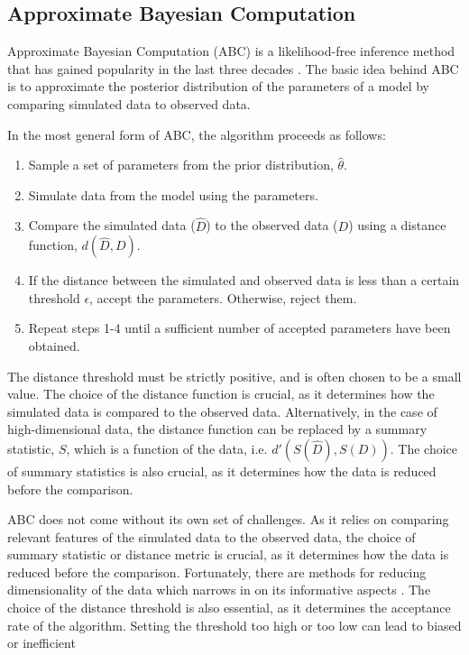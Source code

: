 \subsection{Approximate Bayesian Computation}
Approximate Bayesian Computation (ABC) is a likelihood-free inference method that has gained popularity in the
last three decades \cite{tavare_inferring_1997, lechevallier_integrating_2010, jagiella_parallelization_2017}.
The basic idea behind ABC is to approximate the posterior distribution of the parameters of a model by comparing
simulated data to observed data. \par
In the most general form of ABC, the algorithm proceeds as follows:
\begin{enumerate}
    \item Sample a set of parameters from the prior distribution, $\hat\theta$.
    \item Simulate data from the model using the parameters.
    \item Compare the simulated data ($\hat D$) to the observed data ($D$) using a distance function, $d(\hat D, D)$.
    \item If the distance between the simulated and observed data is less than a certain threshold $\epsilon$, accept the
    parameters. Otherwise, reject them.
    \item Repeat steps 1-4 until a sufficient number of accepted parameters have been obtained.
\end{enumerate}
The distance threshold must be strictly positive, and is often chosen to be a small value. The choice of the distance
function is crucial, as it determines how the simulated data is compared to the observed data. Alternatively, in the
case of high-dimensional data, the distance function can be replaced by a summary statistic, $S$, which is a function of the
data, i.e. $d'(S(\hat D), S(D))$. The choice of summary statistics is also crucial, as it determines how the data is
reduced before the comparison. \par
ABC does not come without its own set of challenges. As it relies on comparing relevant features of the simulated data to
the observed data, the choice of summary statistic or distance metric is crucial, as it determines how the data is
reduced before the comparison. Fortunately, there are methods for reducing dimensionality of the data which
narrows in on its informative aspects \cite{blum_comparative_2013}.
The choice of the distance threshold is also essential, as it determines
the acceptance rate of the algorithm. Setting the threshold too high or too low can lead to biased or inefficient
